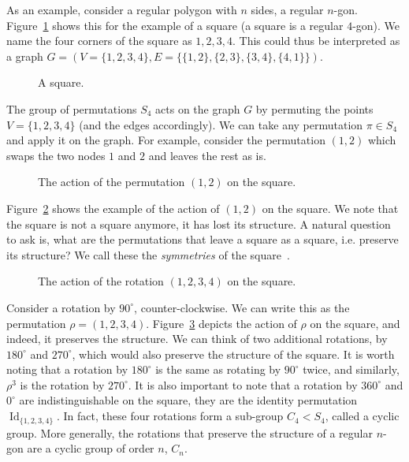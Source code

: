 As an example, consider a regular polygon with $n$ sides, a regular $n$-gon.
Figure~\ref{fig:square} shows this for the example of a square (a square is a regular $4$-gon).
We name the four corners of the square as $1,2,3,4$.
This could thus be interpreted as a graph $G = (V = \{1,2,3,4\}, E = \{ \{1,2\}, \{2,3\},\{3,4\},\{4,1\} \})$.

\begin{figure}[h]
	\centering
\resizebox{0.3\textwidth}{!}{
   \begin{tikzpicture}
     
   \end{tikzpicture}
 }
   \caption{A square.}
   \label{fig:square}
\end{figure}

The group of permutations $S_4$ acts on the graph $G$ by permuting the points $V = \{1,2,3,4\}$ (and the edges accordingly).
We can take any permutation $\pi \in S_4$ and apply it on the graph.
For example, consider the permutation $(1,2)$ which swaps the two nodes $1$ and $2$ and leaves the rest as is.

\begin{figure}[h]
	\centering
\resizebox{0.3\textwidth}{!}{
   \begin{tikzpicture}
     
   \end{tikzpicture}
 }
   \caption{The action of the permutation $(1,2)$ on the square.}
   \label{fig:square_permutation_wrong}
\end{figure}

Figure~\ref{fig:square_permutation_wrong} shows the example of the action of $(1,2)$ on the square.
We note that the square is not a square anymore, it has lost its structure.
A natural question to ask is, what are the permutations that leave a square as a square, i.e. preserve its structure?
We call these the \emph{symmetries} of the square~.

\begin{figure}[h]
	\centering
\resizebox{0.3\textwidth}{!}{
   \begin{tikzpicture}
     
   \end{tikzpicture}
 }
   \caption{The action of the rotation $(1,2,3,4)$ on the square.}
   \label{fig:square_rotation}
\end{figure}

Consider a rotation by $90^\circ$, counter-clockwise. We can write this as the permutation $\rho = (1,2,3,4)$. 
Figure~\ref{fig:square_rotation} depicts the action of $\rho$ on the square, and indeed, it preserves the structure.
We can think of two additional rotations, by $180^\circ$ and $270^\circ$, which would also preserve the structure of the square.
It is worth noting that a rotation by $180^\circ$ is the same as rotating by $90^\circ$ twice, and similarly, $\rho^3$ is the rotation by $270^\circ$.
It is also important to note that a rotation by $360^\circ$ and $0^\circ$ are indistinguishable on the square, they are the identity permutation $\operatorname{Id}_{\{1,2,3,4\}}$.
In fact, these four rotations form a sub-group $C_4 < S_4$, called a cyclic group. More generally, the rotations that preserve the structure of a regular $n$-gon are a cyclic group of order $n$, $C_n$.


